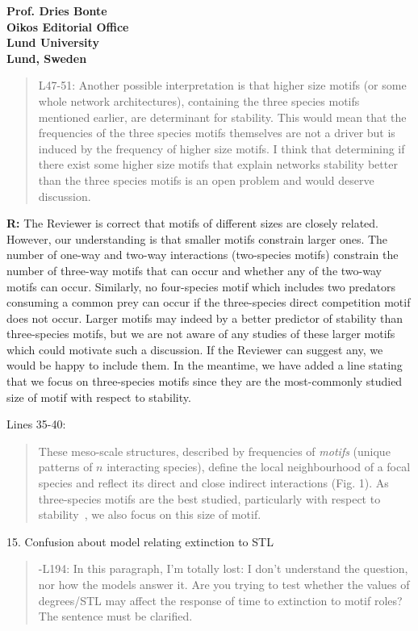 \documentclass[12pt]{letter}
\begin{document}
\begin{letter}{\bf Prof. Dries Bonte\\
Oikos Editorial Office \\
Lund University \\
Lund, Sweden}
        \begin{quotation}
        L47-51: Another possible interpretation is that higher size motifs (or some whole network architectures), containing the three species motifs mentioned earlier, are determinant for stability. This would mean that the frequencies of the three species motifs themselves are not a driver but is induced by the frequency of higher size motifs. I think that determining if there exist some higher size motifs that explain networks stability better than the three species motifs is an open problem and would deserve discussion.
        \end{quotation}
        
        \textbf{R:} The Reviewer is correct that motifs of different sizes are closely related. However, our understanding is that smaller motifs constrain larger ones. The number of one-way and two-way interactions (two-species motifs) constrain the number of three-way motifs that can occur and whether any of the two-way motifs can occur. Similarly, no four-species motif which includes two predators consuming a common prey can occur if the three-species direct competition motif does not occur. Larger motifs may indeed by a better predictor of stability than three-species motifs, but we are not aware of any studies of these larger motifs which could motivate such a discussion. If the Reviewer can suggest any, we would be happy to include them. In the meantime, we have added a line stating that we focus on three-species motifs since they are the most-commonly studied size of motif with respect to stability.
        
        Lines 35-40:
        
        \begin{quotation}
    	These meso-scale structures, described by frequencies of \emph{motifs} (unique patterns of $n$ interacting species), define the local neighbourhood of a focal species and reflect its direct and close indirect interactions (Fig. 1).
        As three-species motifs are the best studied, particularly with respect to stability~\citep{Stouffer2007,Borrelli2015,Borrelli2015a,giling2019plant}, we also focus on this size of motif.
        \end{quotation}



    15. Confusion about model relating extinction to STL 
    
        \begin{quotation}
      -L194: In this paragraph, I’m totally lost: I don’t understand the question, nor how the models answer it. Are you trying to test whether the values of degrees/STL may affect the response of time to extinction to motif roles? The sentence must be clarified.
      \end{quotation}


\end{letter}
\end{document}
